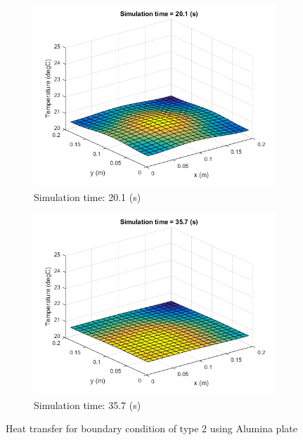 \documentclass[12pt]{article}
\begin{document}
\begin{figure}[H]
\begin{subfigure}[b]{0.475\textwidth}
		\includegraphics[width=\textwidth]{b2cA}
		{{\small Simulation time: 20.1 (s)}}    
	\end{subfigure}
	\quad
	\begin{subfigure}[b]{0.475\textwidth}   
		\centering 
		\includegraphics[width=\textwidth]{b2dA}
		{{\small Simulation time: 35.7 (s)}}    
	\end{subfigure}
	{\small Heat transfer for boundary condition of type 2 using Alumina plate} 
\end{figure}
\end{document}
